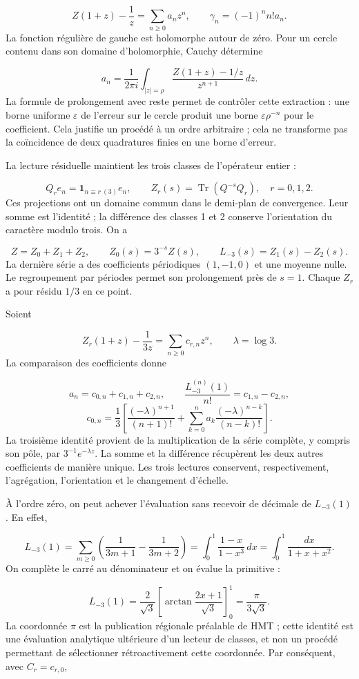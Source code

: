 \[
Z(1+z)-\frac1z=\sum_{n\geq0}a_nz^n,
\qquad \gamma_n=(-1)^nn!a_n.
\]
La fonction régulière de gauche est holomorphe autour de zéro. Pour un cercle contenu dans son domaine d’holomorphie, Cauchy détermine

\[
a_n=\frac1{2\pi i}\int_{|z|=\rho}
\frac{Z(1+z)-1/z}{z^{n+1}}\,dz.
\]
La formule de prolongement avec reste permet de contrôler cette extraction : une borne uniforme \(\varepsilon\) de l’erreur sur le cercle produit une borne \(\varepsilon\rho^{-n}\) pour le coefficient. Cela justifie un procédé à un ordre arbitraire ; cela ne transforme pas la coïncidence de deux quadratures finies en une borne d’erreur.

La lecture résiduelle maintient les trois classes de l'opérateur entier :

\[
Q_re_n=\mathbf1_{n\equiv r\ (3)}e_n,\qquad
Z_r(s)=\operatorname{Tr}(Q^{-s}Q_r),\quad r=0,1,2.
\]
Ces projections ont un domaine commun dans le demi-plan de convergence. Leur somme est l'identité ; la différence des classes 1 et 2 conserve l'orientation du caractère modulo trois. On a

\[
Z=Z_0+Z_1+Z_2,\qquad Z_0(s)=3^{-s}Z(s),\qquad
L_{-3}(s)=Z_1(s)-Z_2(s).
\]
La dernière série a des coefficients périodiques \((1,-1,0)\) et une moyenne nulle. Le regroupement par périodes permet son prolongement près de \(s=1\). Chaque \(Z_r\) a pour résidu \(1/3\) en ce point.

Soient

\[
Z_r(1+z)-\frac1{3z}=\sum_{n\geq0}c_{r,n}z^n,
\qquad \lambda=\log3.
\]
La comparaison des coefficients donne

\[
a_n=c_{0,n}+c_{1,n}+c_{2,n},\qquad
\frac{L_{-3}^{(n)}(1)}{n!}=c_{1,n}-c_{2,n},
\]
\[
c_{0,n}=\frac13\left[
\frac{(-\lambda)^{n+1}}{(n+1)!}
+\sum_{k=0}^na_k\frac{(-\lambda)^{n-k}}{(n-k)!}\right].
\]
La troisième identité provient de la multiplication de la série complète, y compris son pôle, par \(3^{-1}e^{-\lambda z}\). La somme et la différence récupèrent les deux autres coefficients de manière unique. Les trois lectures conservent, respectivement, l'agrégation, l'orientation et le changement d'échelle.

À l’ordre zéro, on peut achever l’évaluation sans recevoir de décimale de \(L_{-3}(1)\). En effet,

\[
L_{-3}(1)=\sum_{m\geq0}\left(\frac1{3m+1}-\frac1{3m+2}\right)
=\int_0^1\frac{1-x}{1-x^3}\,dx
=\int_0^1\frac{dx}{1+x+x^2}.
\]
On complète le carré au dénominateur et on évalue la primitive :

\[
L_{-3}(1)=\frac2{\sqrt3}
\left[\arctan\frac{2x+1}{\sqrt3}\right]_0^1
=\frac{\pi}{3\sqrt3}.
\]
La coordonnée \(\pi\) est la publication régionale préalable de HMT ; cette identité est une évaluation analytique ultérieure d’un lecteur de classes, et non un procédé permettant de sélectionner rétroactivement cette coordonnée. Par conséquent, avec \(C_r=c_{r,0}\),

